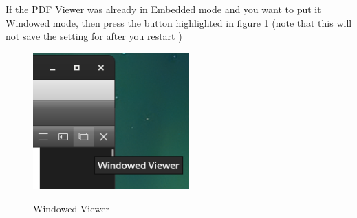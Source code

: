 If the PDF Viewer was already in Embedded mode and you want to put it Windowed mode, then press the button highlighted in figure \ref{fig:windowed-viewer} (note that this will not save the setting for after you restart \TeXstudio)

\begin{figure}[h]
	\caption{Windowed Viewer}
	\centering
	\includegraphics[keepaspectratio,width=6cm]{files/Windowed-Viewer.png}
	\label{fig:windowed-viewer}
\end{figure}


